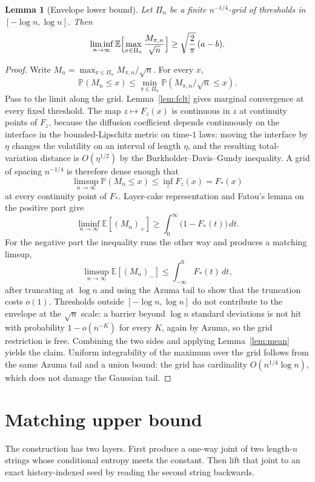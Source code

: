 \documentclass[11pt]{article}
\newtheorem{lemma}[theorem]{Lemma}
\theoremstyle{definition}
\newcommand{\E}{\mathbb{E}}
\newcommand{\Prob}{\mathbb{P}}
\begin{document}
\begin{lemma}[Envelope lower bound]
\label{lem:envelope-exp}
Let \(\Pi_n\) be a finite \(n^{-1/4}\)-grid of thresholds in \([-\log n,\log n]\).
Then
\[
  \liminf_{n\to\infty}
  \E\Bigl[\max_{\pi\in\Pi_n}\frac{M_{\pi,n}}{\sqrt{n}}\Bigr]
  \ge
  \sqrt{\frac{2}{\pi}}\,(a-b).
\]
\end{lemma}

\begin{proof}
Write \(M_n=\max_{\pi\in\Pi_n} M_{\pi,n}/\sqrt{n}\).
For every \(x\),
\[
  \Prob(M_n\le x)
  \le
  \min_{\pi\in\Pi_n}\Prob(M_{\pi,n}/\sqrt{n}\le x).
\]
Pass to the limit along the grid.
Lemma~\ref{lem:fclt} gives marginal convergence at every fixed threshold.
The map \(z\mapsto F_z(x)\) is continuous in \(z\) at continuity points of \(F_z\), because the diffusion coefficient depends continuously on the interface in the bounded-Lipschitz metric on time-\(1\) laws: moving the interface by \(\eta\) changes the volatility on an interval of length \(\eta\), and the resulting total-variation distance is \(O(\eta^{1/2})\) by the Burkholder--Davis--Gundy inequality.
A grid of spacing \(n^{-1/4}\) is therefore dense enough that
\[
  \limsup_{n\to\infty}\Prob(M_n\le x)
  \le
  \inf_z F_z(x)=F_*(x)
\]
at every continuity point of \(F_*\).
Layer-cake representation and Fatou's lemma on the positive part give
\[
  \liminf_{n\to\infty}\E[(M_n)_+]
  \ge
  \int_0^\infty\bigl(1-F_*(t)\bigr)\,dt.
\]
For the negative part the inequality runs the other way and produces a matching limsup,
\[
  \limsup_{n\to\infty}\E[(M_n)_-]
  \le
  \int_{-\infty}^0 F_*(t)\,dt,
\]
after truncating at \(\log n\) and using the Azuma tail to show that the truncation costs \(o(1)\).
Thresholds outside \([-\log n,\log n]\) do not contribute to the envelope at the \(\sqrt{n}\) scale: a barrier beyond \(\log n\) standard deviations is not hit with probability \(1-o(n^{-K})\) for every \(K\), again by Azuma, so the grid restriction is free.
Combining the two sides and applying Lemma~\ref{lem:mean} yields the claim.
Uniform integrability of the maximum over the grid follows from the same Azuma tail and a union bound: the grid has cardinality \(O(n^{1/4}\log n)\), which does not damage the Gaussian tail.
\end{proof}

\section{Matching upper bound}
\label{sec:upper}

The construction has two layers.
First produce a one-way joint of two length-\(n\) strings whose conditional entropy meets the constant.
Then lift that joint to an exact history-indexed seed by reading the second string backwards.
\end{document}
